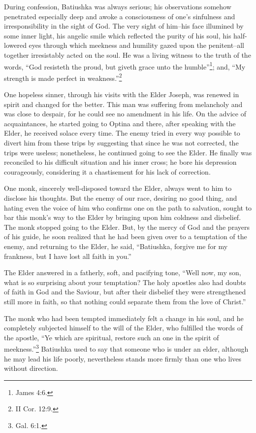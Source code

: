 During confession, Batiushka was always serious; his observations somehow penetrated especially deep and awoke a consciousness of one's sinfulness and irresponsibility in the sight of God. The very sight of him--his face illumined by some inner light, his angelic smile which reflected the purity of his soul, his half-lowered eyes through which meekness and humility gazed upon the penitent--all together irresistably acted on the soul. He was a living witness to the truth of the words, ``God resisteth the proud, but giveth grace unto the humble''\footnote{James 4:6.}; and, ``My strength is made perfect in weakness.''\footnote{II Cor. 12:9.}

One hopeless sinner, through his visits with the Elder Joseph, was renewed in spirit and changed for the better. This man was suffering from melancholy and was close to despair, for he could see no amendment in his life. On the advice of acquaintances, he started going to Optina and there, after speaking with the Elder, he received solace every time. The enemy tried in every way possible to divert him from these trips by suggesting that since he was not corrected, the trips were useless; nonetheless, he continued going to see the Elder. He finally was reconciled to his difficult situation and his inner cross; he bore his depression courageously, considering it a chastisement for his lack of correction.

One monk, sincerely well-disposed toward the Elder, always went to him to disclose his thoughts. But the enemy of our race, desiring no good thing, and hating even the voice of him who confirms one on the path to salvation, sought to bar this monk's way to the Elder by bringing upon him coldness and disbelief. The monk stopped going to the Elder. But, by the mercy of God and the prayers of his guide, he soon realized that he had been given over to a temptation of the enemy, and returning to the Elder, he said, ``Batiushka, forgive me for my frankness, but I have lost all faith in you.''

The Elder answered in a fatherly, soft, and pacifying tone, ``Well now, my son, what is so surprising about your temptation? The holy apostles also had doubts of faith in God and the Saviour, but after their disbelief they were strengthened still more in faith, so that nothing could separate them from the love of Christ.''

The monk who had been tempted immediately felt a change in his soul, and he completely subjected himself to the will of the Elder, who fulfilled the words of the apostle, ``Ye which are spiritual, restore such an one in the spirit of meekness.''\footnote{Gal. 6:1.} Batiushka used to say that someone who is under an elder, although he may lead his life poorly, nevertheless stands more firmly than one who lives without direction.

